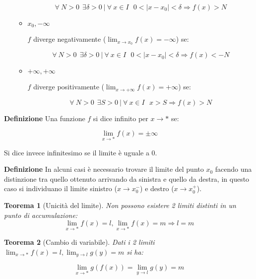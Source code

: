 \documentclass{article}
\newtheorem{theorem}{Teorema}
\begin{document}
\begin{itemize}
\begin{itemize}
        $$\forall\ N>0\ \ \exists\delta>0\ |\ \forall\ x\in I\ \ \ 0<|x-x_0|<\delta\Rightarrow f(x)>N$$

        \item \textbf{$x_0,-\infty$}

        $f$ diverge negativamente ($\lim_{x\rightarrow x_0}f(x)=-\infty$) se:

        $$\forall\ N>0\ \ \exists\delta>0\ |\ \forall\ x\in I\ \ \ 0<|x-x_0|<\delta\Rightarrow f(x)<-N$$

        \item \textbf{$+\infty,+\infty$}

        $f$ diverge positivamente ($\lim_{x\rightarrow +\infty}f(x)=+\infty$) se:

        $$\forall\ N>0 \ \ \exists S>0\ |\ \forall\ x\in I\ \ \ x>S\Rightarrow f(x)>N$$\newline

    \end{itemize}

\end{itemize}

\noindent\textbf{Definizione} Una funzione $f$ si dice infinito per $x\rightarrow*$ se:

$$\lim_{x\rightarrow*}f(x)=\pm\infty$$

\noindent Si dice invece infinitesimo se il limite è uguale a 0.\newline

\noindent\textbf{Definizione} In alcuni casi è necessario trovare il limite del punto $x_0$ facendo una distinzione tra quello ottenuto arrivando da sinistra e quello da destra, in questo caso si individuano il limite sinistro ($x\rightarrow x_0^-$) e destro ($x\rightarrow x_0^+$).\newline

\begin{theorem}[Unicità del limite]
    Non possono esistere 2 limiti distinti in un punto di accumulazione:
    $$\lim_{x\rightarrow *}f(x)=l,\lim_{x\rightarrow *}f(x)=m\Rightarrow l=m$$\newline
\end{theorem}

\begin{theorem}[Cambio di variabile]
Dati i 2 limiti $\lim_{x\rightarrow *}f(x)=l,\lim_{y\rightarrow l}g(y)=m$ si ha:

$$\lim_{x\rightarrow *}g(f(x))=\lim_{y\rightarrow l}g(y)=m$$\newline

\end{theorem}
\end{document}
